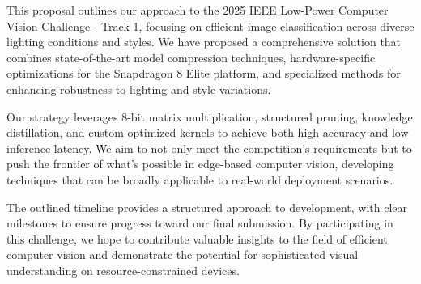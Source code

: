 \documentclass[11pt, oneside]{article}   	%
\begin{document}
This proposal outlines our approach to the 2025 IEEE Low-Power Computer Vision Challenge - Track 1, focusing on efficient image classification across diverse lighting conditions and styles. We have proposed a comprehensive solution that combines state-of-the-art model compression techniques, hardware-specific optimizations for the Snapdragon 8 Elite platform, and specialized methods for enhancing robustness to lighting and style variations.

Our strategy leverages 8-bit matrix multiplication, structured pruning, knowledge distillation, and custom optimized kernels to achieve both high accuracy and low inference latency. We aim to not only meet the competition's requirements but to push the frontier of what's possible in edge-based computer vision, developing techniques that can be broadly applicable to real-world deployment scenarios.

The outlined timeline provides a structured approach to development, with clear milestones to ensure progress toward our final submission. By participating in this challenge, we hope to contribute valuable insights to the field of efficient computer vision and demonstrate the potential for sophisticated visual understanding on resource-constrained devices.
\end{document}
